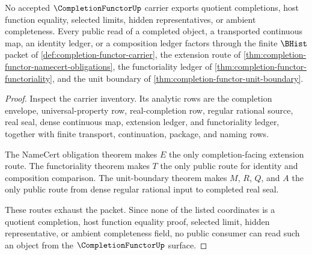 \begin{theorem}
\label{thm:completion-functor-non-escape}
No accepted $\CompletionFunctorUp$ carrier exports quotient completions, host function equality, selected limits, hidden representatives, or ambient completeness. Every public read of a completed object, a transported continuous map, an identity ledger, or a composition ledger factors through the finite $\BHist$ packet of \autoref{def:completion-functor-carrier}, the extension route of \autoref{thm:completion-functor-namecert-obligations}, the functoriality ledger of \autoref{thm:completion-functor-functoriality}, and the unit boundary of \autoref{thm:completion-functor-unit-boundary}.
\end{theorem}
\begin{proof}
Inspect the carrier inventory. Its analytic rows are the completion envelope, universal-property row, real-completion row, regular rational source, real seal, dense continuous map, extension ledger, and functoriality ledger, together with finite transport, continuation, package, and naming rows.

The NameCert obligation theorem makes $E$ the only completion-facing extension route. The functoriality theorem makes $T$ the only public route for identity and composition comparison. The unit-boundary theorem makes $M$, $R$, $Q$, and $A$ the only public route from dense regular rational input to completed real seal.

These routes exhaust the packet. Since none of the listed coordinates is a quotient completion, host function equality proof, selected limit, hidden representative, or ambient completeness field, no public consumer can read such an object from the $\CompletionFunctorUp$ surface.
\end{proof}

